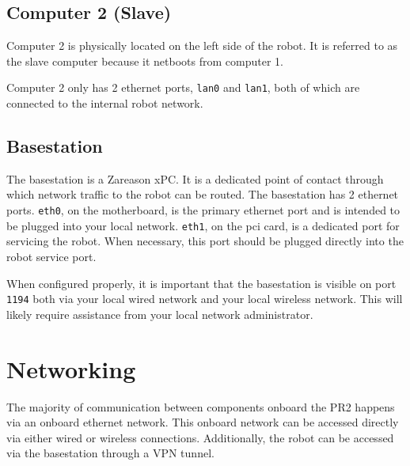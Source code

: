 \subsection{Computer 2 (Slave)}
Computer 2 is physically located on the left side of the
robot. It is referred to as the slave computer because it netboots
from computer 1.

Computer 2 only has 2 ethernet ports, \texttt{lan0} and \texttt{lan1},
both of which are connected to the internal robot network.

\subsection{Basestation}
The basestation is a Zareason xPC.  It is a dedicated
point of contact through which network traffic to the robot can be
routed.  The basestation has 2 ethernet ports. \texttt{eth0}, on the motherboard,
is the primary ethernet port and is intended to be plugged into your
local network.  \texttt{eth1}, on the pci card, is a dedicated port for
servicing the robot.  When necessary, this port should be plugged
directly into the robot service port.

When configured properly, it is important that the basestation is
visible on port \texttt{1194} both via your local wired network and 
your local wireless network.  This will likely require
assistance from your local network administrator.

\section{Networking}
The majority of communication between components onboard the PR2
happens via an onboard ethernet network.  This onboard network can be
accessed directly via either wired or wireless connections.
Additionally, the robot can be accessed via the basestation through a
VPN tunnel.
